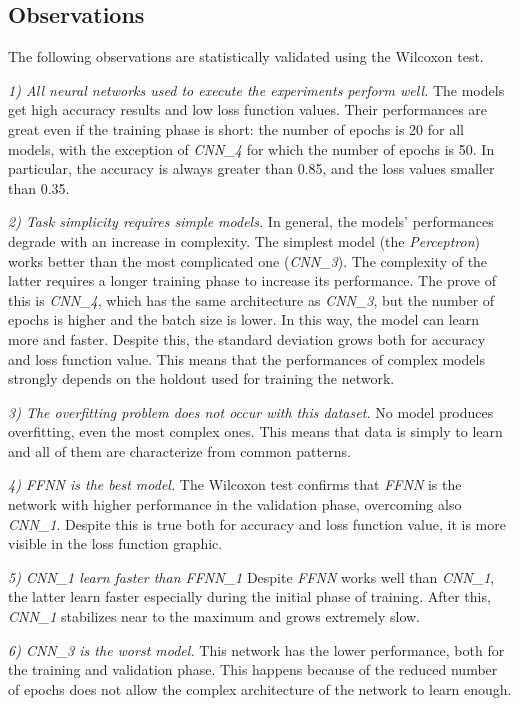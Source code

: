 \subsection{Observations}\label{header-n627}

The following observations are statistically validated using the
Wilcoxon test.

\emph{1) All neural networks used to execute the experiments perform
well.} The models get high accuracy results and low loss function
values. Their performances are great even if the training phase is short:
the number of epochs is 20 for all models, with the exception of
\emph{CNN\_4} for which the number of epochs is 50. In particular, the
accuracy is always greater than 0.85, and the loss values smaller than
0.35.

\emph{2) Task simplicity requires simple models.} In general, the
models' performances degrade with an increase in complexity. The
simplest model (the \emph{Perceptron}) works better than the most
complicated one (\emph{CNN\_3}). The complexity of the latter requires a
longer training phase to increase its performance. The prove of this is
\emph{CNN\_4}, which has the same architecture as \emph{CNN\_3}, but the
number of epochs is higher and the batch size is lower. In this way, the
model can learn more and faster. Despite this, the standard deviation
grows both for accuracy and loss function value. This means that the performances of complex models strongly depends on the holdout used for training the network.

\emph{3) The overfitting problem does not occur with this dataset.} No model produces
overfitting, even the most complex ones. This means that data is simply
to learn and all of them are characterize from common patterns.

\emph{4) FFNN is the best model.} The Wilcoxon test confirms that
\emph{FFNN} is the network with higher performance in the validation
phase, overcoming also \emph{CNN\_1}. Despite this is true both for
accuracy and loss function value, it is more visible in the loss
function graphic.

\emph{5) CNN\_1 learn faster than FFNN\_1} Despite \emph{FFNN} works well than \emph{CNN\_1}, the latter learn faster especially during the initial phase of training. After this, \emph{CNN\_1} stabilizes near to the maximum and grows extremely slow. 

\emph{6) CNN\_3 is the worst model.} This network has the lower performance,
both for the training and validation phase. This happens because of the reduced number
of epochs does not allow the complex architecture of the network to
learn enough.

